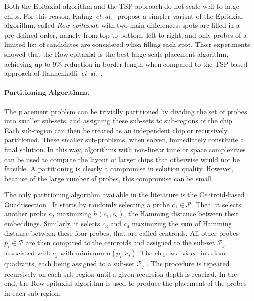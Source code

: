 \documentclass{llncs}
\newcommand{\ignore}[1]{}
\begin{document}
Both the Epitaxial algorithm and the TSP approach do not scale well to large
chips.  For this reason, Kahng~{\it et~al}.~\cite{KAHNG03A} propose a simpler variant
of the Epitaxial algorithm, called \emph{Row-epitaxial}, with two main
differences: spots are filled in a pre-defined order, namely
from top to bottom, left to right, and only probes of a limited list of candidates are
considered when filling each spot. Their experiments showed
that the Row-epitaxial is the best large-scale placement algorithm,
achieving up to 9\% reduction in border length when compared to the
TSP-based approach of Hannenhalli~{\it et~al}.\ \cite{HANNENHALLI02}.

\ignore{
The ever growing number of probes on the latest microarrays and the properties of
the placement problem naturally suggest the use of partitioning strategies to reduce
the running time of the algorithms.
}

\paragraph{Partitioning Algorithms.}
The placement problem can be trivially partitioned by
dividing the set of probes into smaller sub-sets, and assigning these sub-sets to
sub-regions of the chip. Each sub-region can then be treated as an independent chip
or recursively partitioned. These smaller sub-problems, when solved, immediately
constitute a final solution. In this way, algorithms with non-linear time or space
complexities can be used to compute the layout of larger chips that otherwise would not
be feasible. A partitioning is clearly a compromise in solution quality. However,
because of the large number of probes, this compromise can be small.

The only partitioning algorithm available in the literature is the Centroid-based
Quadrisection \cite{KAHNG03B}. It starts by randomly selecting a probe
$c_1 \in \mathcal{P}$. Then, it selects another probe $c_2$ maximizing
$h(c_1,c_2)$, the Hamming distance between their embeddings. Similarly, it selects
$c_3$ and $c_4$ maximizing the sum of Hamming distance between these four probes,
that are called centroids. All other probes
$p_i \in \mathcal{P}$ are then compared to the centroids and assigned to the sub-set
$\mathcal{P}_j$ associated with $c_j$ with minimum $h(p_i,c_j)$. The chip is divided
into four quadrants, each being assigned to a sub-set $\mathcal{P}_j$ .
The procedure is repeated
recursively on each sub-region until a given recursion depth is reached. In the end,
the Row-epitaxial algorithm is used to produce the placement of the probes in each
sub-region.
\end{document}
